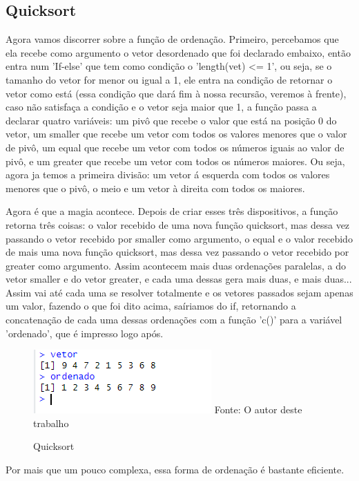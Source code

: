    \subsection{Quicksort}
   Agora vamos discorrer sobre a função de ordenação. Primeiro, percebamos que ela recebe como argumento o vetor desordenado que foi declarado embaixo, então entra num 'If-else' que tem como condição o 'length(vet) <= 1', ou seja, se o tamanho do vetor for menor ou igual a 1, ele entra na condição de retornar o vetor como está (essa condição que dará fim à nossa recursão, veremos à frente), caso não satisfaça a condição e o vetor seja maior que 1, a função passa a declarar quatro variáveis: um pivô que recebe o valor que está na posição 0 do vetor, um smaller que recebe um vetor com todos os valores menores que o valor de pivô, um equal que recebe um vetor com todos os números iguais ao valor de pivô, e um greater que recebe um vetor com todos os números maiores. Ou seja, agora ja temos a primeira divisão: um vetor á esquerda com todos os valores menores que o pivô, o meio e um vetor à direita com todos os maiores.\par Agora é que a magia acontece. Depois de criar esses três dispositivos, a função retorna três coisas: o valor recebido de uma nova função quicksort, mas dessa vez passando o vetor recebido por smaller como argumento, o equal e o valor recebido de mais uma nova função quicksort, mas dessa vez passando o vetor recebido por greater como argumento. Assim acontecem mais duas ordenações paralelas, a do vetor smaller e do vetor greater, e cada uma dessas gera mais duas, e mais duas... Assim vai até cada uma se resolver totalmente e os vetores passados sejam apenas um valor, fazendo o que foi dito acima, saíriamos do if, retornando a concatenação de cada uma dessas ordenações com a função 'c()' para a variável 'ordenado', que é impresso logo após. 
   \begin{figure}[H]
   	\centering
   	\caption{Quicksort}
   	\includegraphics[width=1.0\linewidth]{Prints/screenshot024}
   	\label{fig:screenshot024}
   	{\tiny \sf Fonte: O autor deste trabalho }
   \end{figure}
   Por mais que um pouco complexa, essa forma de ordenação é bastante eficiente.
    
